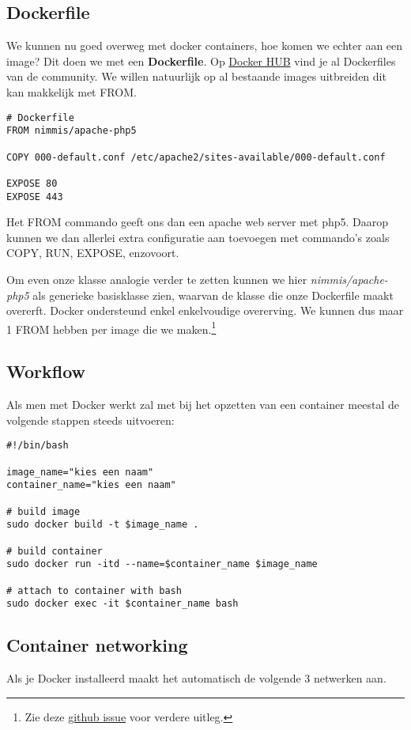 \subsection{Dockerfile}
We kunnen nu goed overweg met docker containers, hoe komen we echter aan een image? Dit doen we met een \textbf{Dockerfile}. Op \href{https://hub.docker.com/}{Docker HUB} vind je al Dockerfiles van de community. We willen natuurlijk op al bestaande images uitbreiden dit kan makkelijk met FROM. 

\begin{verbatim}
# Dockerfile
FROM nimmis/apache-php5

COPY 000-default.conf /etc/apache2/sites-available/000-default.conf

EXPOSE 80
EXPOSE 443
\end{verbatim}

Het FROM commando geeft ons dan een apache web server met php5. Daarop kunnen we dan allerlei extra configuratie aan toevoegen met commando's zoals COPY, RUN, EXPOSE, enzovoort.

Om even onze klasse analogie verder te zetten kunnen we hier \textit{nimmis/apache-php5} als generieke basisklasse zien, waarvan de klasse die onze Dockerfile maakt overerft. Docker ondersteund enkel enkelvoudige overerving. We kunnen dus maar 1 FROM hebben per image die we maken.\footnote{Zie deze  \href{https://github.com/moby/moby/issues/3378}{github issue} voor verdere uitleg.}

\subsection{Workflow}
Als men met Docker werkt zal met bij het opzetten van een container meestal de volgende stappen steeds uitvoeren:

\begin{verbatim}
#!/bin/bash

image_name="kies een naam"
container_name="kies een naam"

# build image
sudo docker build -t $image_name .

# build container
sudo docker run -itd --name=$container_name $image_name

# attach to container with bash
sudo docker exec -it $container_name bash

\end{verbatim}

\subsection{Container networking}
Als je Docker installeerd maakt het automatisch de volgende 3 netwerken aan.

